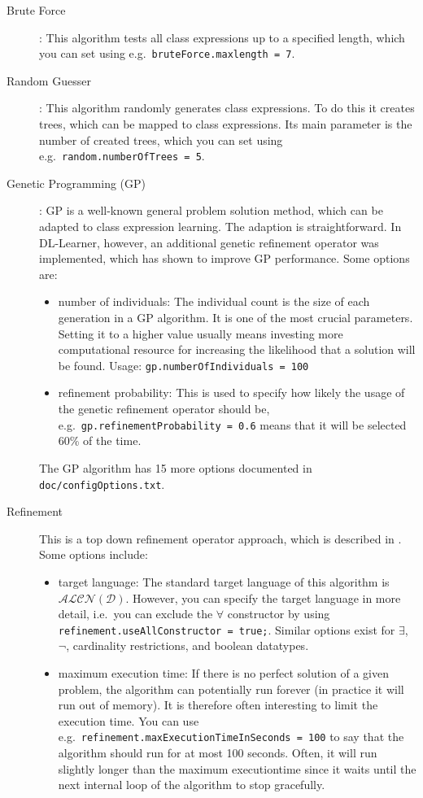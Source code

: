 \documentclass[a4paper,12pt]{scrartcl}
\begin{document}
\begin{description}
 \item[Brute Force]: This algorithm tests all class expressions up to a specified length, which you can set using e.g.~\verb|bruteForce.maxlength = 7|.
 \item[Random Guesser]: This algorithm randomly generates class expressions. To do this it creates trees, which can be mapped to class expressions. Its main parameter is the number of created trees, which you can set using e.g.~\verb|random.numberOfTrees = 5|.
 \item[Genetic Programming (GP)]: GP is a well-known general problem solution method, which can be adapted to class expression learning. The adaption is straightforward. In DL-Learner, however, an additional genetic refinement operator was implemented, which has shown to improve GP performance\cite{hybrid_gp}. Some options are:
 \begin{itemize}
  \item number of individuals: The individual count is the size of each generation in a GP algorithm. It is one of the most crucial parameters. Setting it to a higher value usually means investing more computational resource for increasing the likelihood that a solution will be found. Usage: \verb|gp.numberOfIndividuals = 100|
  \item refinement probability: This is used to specify how likely the usage of the genetic refinement operator should be, e.g.~\verb|gp.refinementProbability = 0.6| means that it will be selected 60\% of the time.
 \end{itemize}
 The GP algorithm has 15 more options documented in \verb|doc/configOptions.txt|.
 \item[Refinement] This is a top down refinement operator approach, which is described in \cite{alc_learning_algorithm}. Some options include:
 \begin{itemize}
  \item target language: The standard target language of this algorithm is $\mathcal{ALCN(D)}$. However, you can specify the target language in more detail, i.e.~you can exclude the $\forall$ constructor by using \verb|refinement.useAllConstructor = true;|. Similar options exist for $\exists$, $\neg$, cardinality restrictions, and boolean datatypes.
  \item maximum execution time: If there is no perfect solution of a given problem, the algorithm can potentially run forever (in practice it will run out of memory). It is therefore often interesting to limit the execution time. You can use e.g.~\verb|refinement.maxExecutionTimeInSeconds = 100| to say that the algorithm should run for at most 100 seconds. Often, it will run slightly longer than the maximum executiontime since it waits until the next internal loop of the algorithm to stop gracefully.

\end{itemize}
\end{description}
\end{document}
